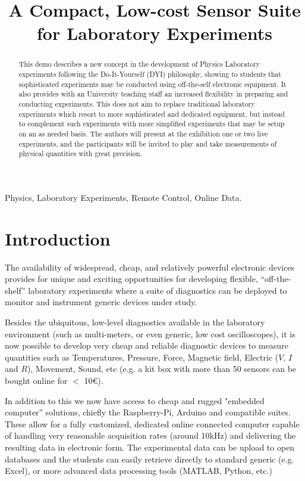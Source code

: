 \documentclass[conference]{IEEEtran}
\begin{document}
\title{A Compact, Low-cost Sensor Suite  for Laboratory Experiments
}

\author{}
\maketitle

\begin{abstract}
This demo describes a new concept in the development of Physics Laboratory experiments 
 following  the Do-It-Yourself (DYI) philosophy, showing to students that sophisticated experiments may be conducted using off-the-self electronic equipment.
It also provides with an University teaching staff an increased flexibility in preparing and conducting experiments. 
This does not aim to replace traditional laboratory experiments which resort to more sophisticated and dedicated equipment,
but instead to complement such experiments with more simplified experiments that may be setup on an as needed basis.
The authors will present at the exhibition one or two live experiments, and the participants will be invited to play 
and take measurements of physical quantities with great precision.

\end{abstract}

\begin{IEEEkeywords}
Physics, Laboratory Experiments, Remote Control, Online Data.
\end{IEEEkeywords}

\section{Introduction}
The availability of widespread, cheap, and relatively powerful electronic devices provides for unique and exciting opportunities for developing flexible, ``off-the-shelf'' laboratory experiments where a suite of diagnostics can be deployed to monitor and instrument generic devices under study.

Besides the ubiquitous, low-level diagnostics available in the laboratory environment (such as multi-meters, or even generic, low cost oscilloscopes), it is now possible to develop very cheap and reliable diagnostic devices to measure quantities such as  
Temperatures, Pressure, Force, Magnetic field, Electric ($V$, $I$ and $R$), Movement, Sound, etc (e.g. a kit box with more than 50 sensors can be bought online for $<$ 10€).

In addition to this we now have access to cheap and rugged "embedded computer” solutions, chiefly the Raspberry-Pi, Arduino\cite{b2} and compatible suites.
These allow for a fully customized, dedicated online connected computer capable of handling very reasonable acquisition rates (around 10kHz) 
and delivering the resulting data in electronic form. 
The experimental data can be upload to open databases and the students can easily retrieve 
 directly to standard generic (e.g. Excel), or more advanced data processing tools
 (MATLAB, Python, etc.)
\end{document}

